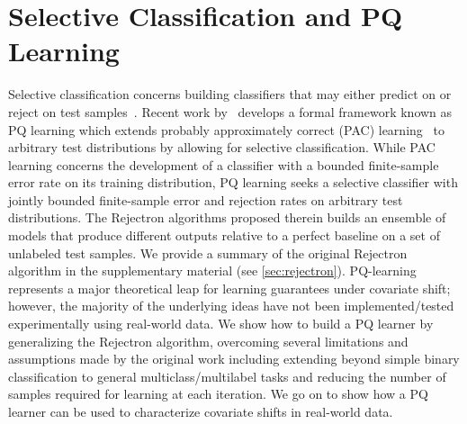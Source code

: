 \section{Selective Classification and PQ Learning}\label{sec:selective-classification-and-pq-learning}
Selective classification concerns building classifiers that may either predict on or reject on test samples~\citep{selectivenet}.
Recent work by~\citep{pqlearn} develops a formal framework known as PQ learning which extends probably approximately correct (PAC) learning~\citep{Haussler90probablyapproximately} to arbitrary test distributions by allowing for selective classification.
While PAC learning concerns the development of a classifier with a bounded finite-sample error rate on its training distribution, PQ learning seeks a selective classifier with jointly bounded finite-sample error and rejection rates on arbitrary test distributions.
The Rejectron algorithms proposed therein builds an ensemble of models that produce different outputs relative to a perfect baseline on a set of unlabeled test samples.
We provide a summary of the original Rejectron algorithm in the supplementary material (see \autoref{sec:rejectron}).
PQ-learning represents a major theoretical leap for learning guarantees under covariate shift;
however, the majority of the underlying ideas have not been implemented/tested experimentally using real-world data.
We show how to build a PQ learner by generalizing the Rejectron algorithm, overcoming several limitations and assumptions made by the original work including extending beyond simple binary classification to general multiclass/multilabel tasks and reducing the number of samples required for learning at each iteration.
We go on to show how a PQ learner can be used to characterize covariate shifts in real-world data.
